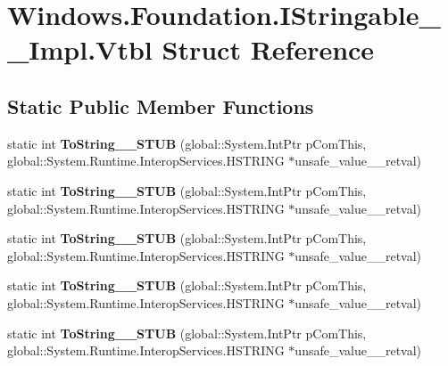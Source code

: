\hypertarget{struct_windows_1_1_foundation_1_1_i_stringable_____impl_1_1_vtbl}{}\section{Windows.\+Foundation.\+I\+Stringable\+\_\+\+\_\+\+Impl.\+Vtbl Struct Reference}
\label{struct_windows_1_1_foundation_1_1_i_stringable_____impl_1_1_vtbl}
\subsection*{Static Public Member Functions}
\begin{DoxyCompactItemize}
\item 
\mbox{\label{struct_windows_1_1_foundation_1_1_i_stringable_____impl_1_1_vtbl_ad867a97eb4485ecadd325ef691eae83c}} 
static int {\bfseries To\+String\+\_\+\+\_\+\+S\+T\+UB} (global\+::\+System.\+Int\+Ptr p\+Com\+This, global\+::\+System.\+Runtime.\+Interop\+Services.\+H\+S\+T\+R\+I\+NG $\ast$unsafe\+\_\+value\+\_\+\+\_\+retval)
\item 
\mbox{\label{struct_windows_1_1_foundation_1_1_i_stringable_____impl_1_1_vtbl_ad867a97eb4485ecadd325ef691eae83c}} 
static int {\bfseries To\+String\+\_\+\+\_\+\+S\+T\+UB} (global\+::\+System.\+Int\+Ptr p\+Com\+This, global\+::\+System.\+Runtime.\+Interop\+Services.\+H\+S\+T\+R\+I\+NG $\ast$unsafe\+\_\+value\+\_\+\+\_\+retval)
\item 
\mbox{\label{struct_windows_1_1_foundation_1_1_i_stringable_____impl_1_1_vtbl_ad867a97eb4485ecadd325ef691eae83c}} 
static int {\bfseries To\+String\+\_\+\+\_\+\+S\+T\+UB} (global\+::\+System.\+Int\+Ptr p\+Com\+This, global\+::\+System.\+Runtime.\+Interop\+Services.\+H\+S\+T\+R\+I\+NG $\ast$unsafe\+\_\+value\+\_\+\+\_\+retval)
\item 
\mbox{\label{struct_windows_1_1_foundation_1_1_i_stringable_____impl_1_1_vtbl_ad867a97eb4485ecadd325ef691eae83c}} 
static int {\bfseries To\+String\+\_\+\+\_\+\+S\+T\+UB} (global\+::\+System.\+Int\+Ptr p\+Com\+This, global\+::\+System.\+Runtime.\+Interop\+Services.\+H\+S\+T\+R\+I\+NG $\ast$unsafe\+\_\+value\+\_\+\+\_\+retval)
\item 
\mbox{\label{struct_windows_1_1_foundation_1_1_i_stringable_____impl_1_1_vtbl_ad867a97eb4485ecadd325ef691eae83c}} 
static int {\bfseries To\+String\+\_\+\+\_\+\+S\+T\+UB} (global\+::\+System.\+Int\+Ptr p\+Com\+This, global\+::\+System.\+Runtime.\+Interop\+Services.\+H\+S\+T\+R\+I\+NG $\ast$unsafe\+\_\+value\+\_\+\+\_\+retval)
\end{DoxyCompactItemize}

